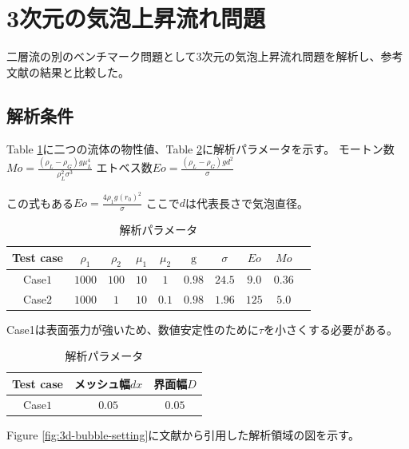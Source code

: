 \newpage
\section{3次元の気泡上昇流れ問題}

二層流の別のベンチマーク問題として3次元の気泡上昇流れ問題を解析し、参考文献の結果と比較した。

\subsection{解析条件}

Table \ref{table:3d-bubble-material-property}に二つの流体の物性値、Table \ref{table:3d-bubble-parameter}に解析パラメータを示す。
モートン数$Mo = \frac{(\rho_L-\rho_G)g \mu_L^4 }{\rho_L^2 \sigma^3}$
エトベス数$Eo = \frac{(\rho_L-\rho_G) g d^2}{\sigma}$


この式もある$Eo = \frac{4\rho_1 g (r_0)^2}{\sigma}$
ここで$d$は代表長さで気泡直径。

\renewcommand{\arraystretch}{1}
\begin{table}[H]
	\centering
	\caption{解析パラメータ}
	\begin{tabular}{cccccccccc}
		\hline
		Test case & $\rho_1$ & $\rho_2$ & $\mu_1$ & $\mu_2$ & $\mathrm{g}$ & $\sigma$ & $Eo$ & $Mo$ \\
		\hline 
		Case$1$ & $1000$ & $100$ & $10$ & $1$   & $0.98$ & $24.5$ & $9.0$ & $0.36$\\
		Case$2$ & $1000$ & $1$   & $10$ & $0.1$ & $0.98$ & $1.96$ & $125$ & $5.0$\\ 
		\hline         
	\end{tabular}
	\label{table:3d-bubble-material-property}
\end{table}
\renewcommand{\arraystretch}{1.0}

Case1は表面張力が強いため、数値安定性のために$\tau$を小さくする必要がある。\cite{Yamaguchi2018}


\renewcommand{\arraystretch}{1}
\begin{table}[H]
	\centering
	\caption{解析パラメータ}
	\begin{tabular}{ccc}
		\hline
		Test case & メッシュ幅$dx$ & 界面幅$D$\\
		\hline 
		Case$1$ & $0.05$ & $0.05$\\
		\hline         
	\end{tabular}
	\label{table:3d-bubble-parameter}
\end{table}
\renewcommand{\arraystretch}{1.0}

Figure \ref{fig:3d-bubble-setting}に文献\cite{Safi2017}から引用した解析領域の図を示す。

